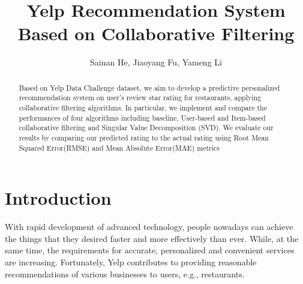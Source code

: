 \documentclass{llncs}
\begin{document}
%
\frontmatter          %
%
\pagestyle{headings}  %


%

%
\mainmatter              %
%
\title{Yelp Recommendation System Based on Collaborative Filtering}
%
%
\author{Sainan He, Jiaoyang Fu, Yameng Li}
%
%
%

\maketitle              %

\begin{abstract}
Based on Yelp Data Challenge dataset, we aim to develop a predictive personalized recommendation system on user’s review star rating for restaurants, applying collaborative filtering algorithms. In particular, we implement and compare the performances of four algorithms including baseline, User-based and Item-based collaborative filtering and Singular Value Decomposition (SVD). We evaluate our results by comparing our predicted rating to the actual rating using Root Mean Squared Error(RMSE) and Mean Absolute Error(MAE) metrics
\end{abstract}
%
\section{Introduction}
%
With rapid development of advanced technology, people nowadays can achieve the things that they desired faster and more effectively than ever. While, at the same time, the requirements for accurate, personalized and convenient services are increasing. Fortunately, Yelp contributes to providing reasonable recommendations of various businesses to users, e.g., restaurants.
\end{document}
